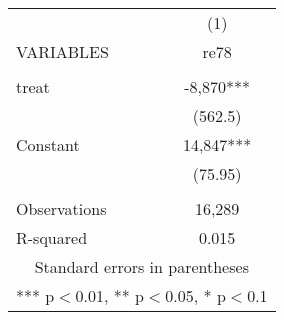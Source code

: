 \begin{tabular}{lc} \hline
 & (1) \\
VARIABLES & re78 \\ \hline
 &  \\
treat & -8,870*** \\
 & (562.5) \\
Constant & 14,847*** \\
 & (75.95) \\
 &  \\
Observations & 16,289 \\
 R-squared & 0.015 \\ \hline
\multicolumn{2}{c}{ Standard errors in parentheses} \\
\multicolumn{2}{c}{ *** p$<$0.01, ** p$<$0.05, * p$<$0.1} \\
\end{tabular}
